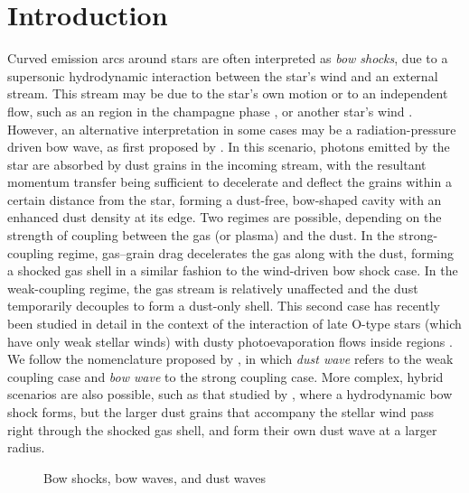 \newcommand\PaperI{\citetalias{Tarango-Yong:2018a}}

\section{Introduction}
\label{sec:introduction}
\newcommand\hii{\ion{H}{ii}}

Curved emission arcs around stars \citep[e.g.,][]{Gull:1979a} are
often interpreted as \textit{bow shocks}, due to a supersonic
hydrodynamic interaction between the star's wind and an external
stream. This stream may be due to the star's own motion or to an
independent flow, such as an \hii{} region in the champagne phase
\citep{Tenorio-Tagle:1979a}, or another star's wind
\citep{Canto:1996}. However, an alternative interpretation in some
cases may be a radiation-pressure driven bow wave, as first proposed
by \citet[\S\textsc{vi}]{van-Buren:1988a}.  In this scenario, photons
emitted by the star are absorbed by dust grains in the incoming
stream, with the resultant momentum transfer being sufficient to
decelerate and deflect the grains within a certain distance from the
star, forming a dust-free, bow-shaped cavity with an enhanced dust
density at its edge.  Two regimes are possible, depending on the
strength of coupling between the gas (or plasma) and the dust.  In the
strong-coupling regime, gas--grain drag decelerates the gas along with
the dust, forming a shocked gas shell in a similar fashion to the
wind-driven bow shock case.  In the weak-coupling regime, the gas
stream is relatively unaffected and the dust temporarily decouples to
form a dust-only shell.  This second case has recently been studied in
detail in the context of the interaction of late O-type stars (which
have only weak stellar winds) with dusty photoevaporation flows inside
\hii{} regions \citep{Ochsendorf:2014a, Ochsendorf:2014b,
  Ochsendorf:2015a}.  We follow the nomenclature proposed by
\citet{Ochsendorf:2014b}, in which \textit{dust wave} refers to the
weak coupling case and \textit{bow wave} to the strong coupling case.
More complex, hybrid scenarios are also possible, such as that studied
by \citet{van-Marle:2011a}, where a hydrodynamic bow shock forms, but
the larger dust grains that accompany the stellar wind pass right
through the shocked gas shell, and form their own dust wave at a
larger radius.

\begin{figure}
  \centering
  \caption{Bow shocks, bow waves, and dust waves}
  \label{fig:3-types-bow}
\end{figure}

